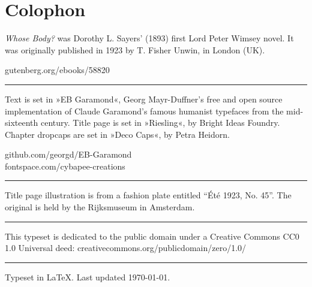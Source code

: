 \documentclass[
paper=5.5in:8.5in
]{scrbook}
\begin{document}
\chapter*{Colophon}
\begin{center}
\begin{minipage}{\textwidth}
\textit{Whose Body?} was Dorothy L. Sayers' (1893) first Lord Peter Wimsey novel. It was originally published in 1923 by T. Fisher Unwin, in London (UK).
\end{minipage}
\vfill
gutenberg.org/ebooks/58820
\vfill
\rule{0.5\textwidth}{.4pt}
\vfill
\begin{minipage}{\textwidth}
Text is set in »EB Garamond«, Georg Mayr-Duffner's free and open source implementation of Claude Garamond’s famous humanist typefaces from the mid-sixteenth century. Title page is set in »Riesling«, by Bright Ideas Foundry. Chapter dropcaps are set in »Deco Caps«, by Petra Heidorn.
\end{minipage}
\vfill
github.com/georgd/EB-Garamond\\fontspace.com/cybapee-creations
\vfill
\rule{0.5\textwidth}{.4pt}
\vfill
\begin{minipage}{\textwidth}
Title page illustration is from a fashion plate entitled \foreignquote{french}{Été 1923, No. 45}. The original is held by the Rijksmuseum in Amsterdam.
\end{minipage}
\vfill
\rule{0.5\textwidth}{.4pt}
\vfill
\begin{minipage}{\textwidth}
This typeset is dedicated to the public domain under a Creative Commons CC0 1.0 Universal deed: creativecommons.org/publicdomain/zero/1.0/
\end{minipage}
\vfill
\rule{0.5\textwidth}{.4pt}
\vfill
Typeset in \LaTeX{}. Last updated \today.
\end{center}
\thispagestyle{empty}
\end{document}
